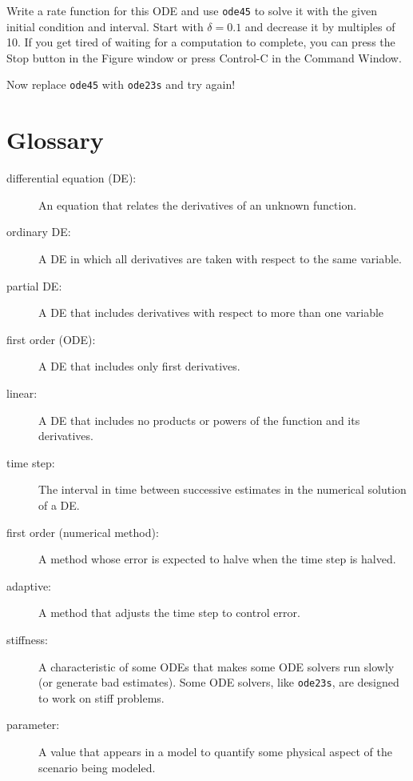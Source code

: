 \documentclass{book}
\begin{document}
\begin{ex}
Write a rate function for this ODE and use
{\tt ode45} to solve it with the given initial condition and interval.
Start with $\delta = 0.1$ and decrease it by multiples of 10.  If
you get tired of waiting for a computation to complete, you can 
press the Stop button in the Figure window or press Control-C in
the Command Window.

Now replace {\tt ode45} with {\tt ode23s} and try again!
\end{ex}



\section{Glossary}

\begin{description}

\item[differential equation (DE):] An equation that relates the
derivatives of an unknown function.

\item[ordinary DE:] A DE in which all derivatives are taken with
respect to the same variable.

\item[partial DE:] A DE that includes derivatives with respect to
more than one variable

\item[first order (ODE):] A DE that includes only first derivatives.

\item[linear:] A DE that includes no products or powers of the
function and its derivatives.

\item[time step:] The interval in time between successive estimates
in the numerical solution of a DE.

\item[first order (numerical method):] A method whose error is expected
to halve when the time step is halved.

\item[adaptive:] A method that adjusts the time step to control error.

\item[stiffness:] A characteristic of some ODEs that makes some ODE
solvers run slowly (or generate bad estimates).  Some ODE solvers,
like {\tt ode23s}, are designed to work on stiff problems.

\item[parameter:] A value that appears in a model to quantify some
physical aspect of the scenario being modeled.

\end{description}
\end{document}

